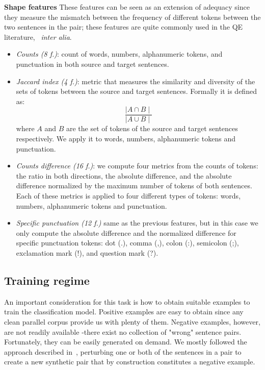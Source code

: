 \textbf{Shape features} These features can be seen as an extension of adequacy since they measure the mismatch between the frequency of different tokens between the two sentences in the pair; these features are quite commonly used in the QE literature,~\cite{specia15} \textit{inter alia}.
\begin{itemize}
\item \textit{Counts (8 f.)}: count of words, numbers, alphanumeric tokens, and punctuation in both source and target sentences.
\item \textit{Jaccard index (4 f.)}: metric that measures the similarity and diversity of the sets of tokens between the source and target sentences. Formally it is defined as:
$$ \frac{\mid A\cap B\mid}{\mid A\cup B\mid}$$
where $A$ and $B$ are the set of tokens of the source and target sentences respectively. We apply it to words, numbers, alphanumeric tokens and punctuation.
\item \textit{Counts difference (16 f.)}: we compute four metrics from the counts of tokens: the ratio in both directions, the absolute difference, and the absolute difference normalized by the maximum number of tokens of both sentences. Each of these metrics is applied to four different types of tokens: words, numbers, alphanumeric tokens and punctuation.
\item \textit{Specific punctuation (12 f.)} same as the previous features, but in this case we only compute the absolute difference and the normalized difference for specific punctuation tokens: dot (.), comma (,), colon (:), semicolon (;), exclamation mark (!), and question mark (?).
\end{itemize}


\subsection{Training regime}
\label{ssec:training}

An important consideration for this task is how to obtain suitable examples to train the classification model. Positive examples are easy to obtain since any clean parallel corpus provide us with plenty of them. Negative examples, however, are not readily available -there exist no collection of "wrong" sentence pairs. Fortunately, they can be easily generated on demand. We mostly followed the approach described in~\cite{Hainan17}, perturbing one or both of the sentences in a pair to create a new synthetic pair that by construction constitutes a negative example.

